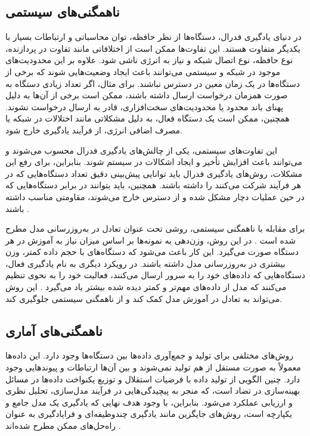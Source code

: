 \subsection{
	ناهمگنی‌های سیستمی%
}
در دنیای یادگیری فدرال، دستگاه‌ها از نظر حافظه، توان محاسباتی و ارتباطات بسیار با یکدیگر متفاوت هستند. این تفاوت‌ها ممکن است از اختلافاتی مانند تفاوت در پردازنده، نوع حافظه، نوع اتصال شبکه و نیاز به انرژی ناشی شود. علاوه بر این محدودیت‌های موجود در شبکه و سیستمی می‌توانند باعث ایجاد وضعیت‌هایی شوند که برخی از دستگاه‌ها در یک زمان معین در دسترس نباشند. برای مثال، اگر تعداد زیادی دستگاه به صورت همزمان درخواست ارسال داشته باشند، ممکن است برخی از آن‌ها به دلیل پهنای باند محدود یا محدودیت‌های سخت‌افزاری، قادر به ارسال درخواست نشوند. همچنین، ممکن است یک دستگاه فعال، به دلیل مشکلاتی مانند اختلالات در شبکه یا مصرف اضافی انرژی، از فرآیند یادگیری خارج شود.

این تفاوت‌های سیستمی، یکی از چالش‌های یادگیری فدرال محسوب می‌شوند و می‌توانند باعث افزایش تأخیر و ایجاد اشکالات در سیستم شوند. بنابراین، برای رفع این مشکلات، روش‌های یادگیری فدرال باید توانایی پیش‌بینی دقیق تعداد دستگاه‌هایی که در هر فرآیند شرکت می‌کنند را داشته باشند. همچنین، باید بتوانند در برابر دستگاه‌هایی که در حین عملیات دچار مشکل شده و از دسترس خارج می‌شوند، مقاومتی مناسب داشته باشند
\cite{li2020federated}.


برای مقابله با ناهمگنی سیستمی، روشی تحت عنوان تعادل در به‌روزرسانی مدل مطرح شده است
\cite{konevcny2015federated}.
در این روش، وزن‌دهی به نمونه‌ها بر اساس میزان نیاز به آموزش در هر دستگاه صورت می‌گیرد. این کار باعث می‌شود که دستگاه‌های با حجم داده کمتر، وزن بیشتری در به‌روزرسانی مدل داشته باشند.
در رویکرد دیگری به نام یادگیری فعال، دستگاه‌هایی که داده‌های خود را به سرور ارسال می‌کنند، فعالیت خود را به نحوی تنظیم می‌کنند که مدل از داده‌های مهم‌تر و کمتر دیده شده بیشتر یاد می‌گیرد
\cite{konevcny2016federated}.
این روش می‌تواند به تعادل در آموزش مدل کمک کند و از ناهمگنی سیستمی جلوگیری کند.


\subsection{
	ناهمگنی‌های آماری%
}
روش‌های مختلفی برای تولید و جمع‌آوری داده‌ها بین دستگاه‌ها وجود دارد. این داده‌ها معمولاً به صورت مستقل از هم تولید نمی‌شوند و بین آن‌ها ارتباطات و پیوندهایی وجود دارد. چنین الگویی از تولید داده با فرضیات استقلال و توزیع یکنواخت داده‌ها
در مسائل بهینه‌سازی در تضاد است، که منجر به پیچیدگی‌هایی در فرآیند مدل‌سازی، تحلیل نظری و ارزیابی عملکرد می‌شود. بنابراین، با وجود هدف نهایی که یادگیری یک مدل جامع و یکپارچه است، روش‌های جایگزین مانند یادگیری چندوظیفه‌ای%
و فرایادگیری%
به عنوان راه‌حل‌های ممکن مطرح شده‌اند
\cite{li2020federated}.


